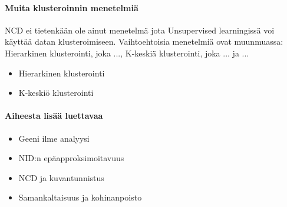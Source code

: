 \documentclass[12pt,finnish]{tktltiki2}
\theoremstyle{definition}
\theoremstyle{remark}
\begin{document}
\paragraph{Muita klusteroinnin menetelmiä} %
\label{par:muita_klusteroinnin_menetelmia}
  NCD ei tietenkään ole ainut menetelmä jota Unsupervised learningissä voi käyttää datan klusteroimiseen. Vaihtoehtoisia menetelmiä ovat muunmuassa: Hierarkinen klusterointi, joka ..., K-keskiä klusterointi, joka ... ja ...
  \begin{itemize}
    \item Hierarkinen klusterointi %
    \item K-keskiö klusterointi %
  \end{itemize}

\paragraph{Aiheesta lisää luettavaa} %
\label{par:aiheesta_lisaa_luettavaa}
  \begin{itemize}
    \item Geeni ilme analyysi %
    \item NID:n epäapproksimoitavuus
    \item NCD ja kuvantunnistus \cite{doi:10.1117/12.704334}
    \item Samankaltaisuus ja kohinanpoisto
  \end{itemize}


\pagebreak
%
%

%

% 





%
\end{document}
